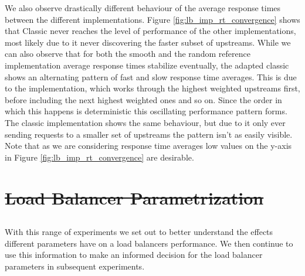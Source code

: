 \documentclass[draft,final]{vutinfth} %
\providecommand{\DIFaddtex}[1]{{\protect\color{blue}\uwave{#1}}} %
\providecommand{\DIFdeltex}[1]{{\protect\color{red}\sout{#1}}}                      %
\providecommand{\DIFaddbegin}{} %
\providecommand{\DIFaddend}{} %
\providecommand{\DIFdelbegin}{} %
\providecommand{\DIFdelend}{} %
\providecommand{\DIFadd}[1]{\texorpdfstring{\DIFaddtex{#1}}{#1}} %
\providecommand{\DIFdel}[1]{\texorpdfstring{\DIFdeltex{#1}}{}} %
\begin{document}
We also observe drastically different behaviour of the average response times between the different implementations.
Figure \ref{fig:lb_imp_rt_convergence} shows that Classic never reaches the level of performance of the other implementations, most likely due to it never discovering the faster subset of upstreams.
While we can also observe that for both the smooth and the random reference implementation average response times stabilize eventually, the adapted classic shows an alternating pattern of fast and slow response time averages.
This is due to the implementation, which works through the highest weighted upstreams first, before including the next highest weighted ones and so on.
Since the order in which this happens is deterministic this oscillating performance pattern forms.
The classic implementation shows the same behaviour, but due to it only ever sending requests to a smaller set of upstreams the pattern isn't as easily visible.
Note that as we are considering response time averages low values on the y-axis in Figure \ref{fig:lb_imp_rt_convergence} are desirable.


























\DIFdelbegin %
\section{\DIFdel{Load Balancer Parametrization}}
\addtocounter{section}{-1}%
\DIFdelend \DIFaddbegin \subsection{\DIFadd{Load Balancer Parametrization}}
\DIFaddend %
With this range of experiments we set out to better understand the effects different parameters have on a load balancers performance.
We then continue to use this information to make an informed decision for the load balancer parameters in subsequent experiments.
\end{document}
